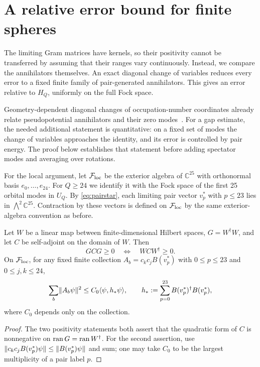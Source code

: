 \section{A relative error bound for finite spheres}
\label{sec:transfer}
The limiting Gram matrices have kernels, so their positivity cannot be
transferred by assuming that their ranges vary continuously.  Instead, we
compare the annihilators themselves.  An exact diagonal change of variables
reduces every error to a fixed finite family of pair-generated annihilators.
This gives an error relative to $H_Q$, uniformly on the full Fock space.

Geometry-dependent diagonal changes of occupation-number coordinates
already relate pseudopotential annihilators and their zero modes~\cite[Section~II.E]{OrtizNussinovDukelskySeidel}.
For a gap estimate, the needed additional statement is quantitative:
on a fixed set of modes the change of variables approaches the identity,
and its error is controlled by pair energy. The proof below establishes
that statement before adding spectator modes and averaging over rotations.

For the local argument, let $\mathcal F_{\mathrm{loc}}$ be the exterior algebra
of $\mathbb C^{25}$ with orthonormal basis $e_0,\ldots,e_{24}$.
For $Q\ge24$ we identify it with the Fock space of the first 25 orbital
modes in $U_Q$. By \eqref{eq:pairstar}, each limiting pair vector $v_p^*$
with $p\le23$ lies in $\bigwedge^2\mathbb C^{25}$.
Contraction by these vectors is defined on $\mathcal F_{\mathrm{loc}}$
by the same exterior-algebra convention as before.

\begin{lemma}\label{lem:compression}
Let $W$ be a linear map between finite-dimensional Hilbert spaces,
$G=W^\dagger W$, and let $C$ be self-adjoint on the domain of $W$. Then
\[
 GCG\ge0\quad\Longleftrightarrow\quad WCW^\dagger\ge0.
\]
On $\mathcal F_{\mathrm{loc}}$, for any fixed finite collection
$A_b=c_kc_jB(v_p^*)$ with $0\le p\le23$ and $0\le j,k\le24$,
\begin{equation}\label{eq:annihilatorbound}
 \sum_b\lVert A_b\psi\rVert^2\le C_0\langle \psi,h_*\psi\rangle,
 \qquad h_*:=\sum_{p=0}^{23}B(v_p^*)^\dagger B(v_p^*),
\end{equation}
where $C_0$ depends only on the collection.
\end{lemma}
\begin{proof}
The two positivity statements both assert that the quadratic form of $C$
is nonnegative on $\operatorname{ran} G=\operatorname{ran} W^\dagger$.  For the second assertion, use
$\lVert c_kc_jB(v_p^*)\psi\rVert\le\lVert B(v_p^*)\psi\rVert$ and sum; one may take
$C_0$ to be the largest multiplicity of a pair label $p$.
\end{proof}

